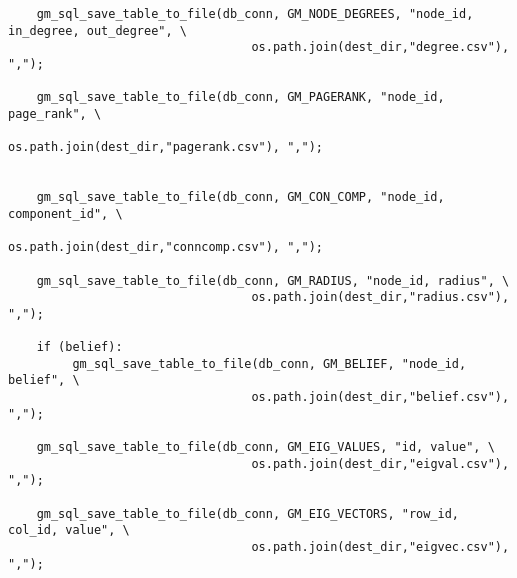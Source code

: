\begin{lstlisting}
    gm_sql_save_table_to_file(db_conn, GM_NODE_DEGREES, "node_id, in_degree, out_degree", \
                                  os.path.join(dest_dir,"degree.csv"), ",");

    gm_sql_save_table_to_file(db_conn, GM_PAGERANK, "node_id, page_rank", \
                                  os.path.join(dest_dir,"pagerank.csv"), ",");


    gm_sql_save_table_to_file(db_conn, GM_CON_COMP, "node_id, component_id", \
                                  os.path.join(dest_dir,"conncomp.csv"), ",");

    gm_sql_save_table_to_file(db_conn, GM_RADIUS, "node_id, radius", \
                                  os.path.join(dest_dir,"radius.csv"), ",");

    if (belief):
         gm_sql_save_table_to_file(db_conn, GM_BELIEF, "node_id, belief", \
                                  os.path.join(dest_dir,"belief.csv"), ",");

    gm_sql_save_table_to_file(db_conn, GM_EIG_VALUES, "id, value", \
                                  os.path.join(dest_dir,"eigval.csv"), ",");

    gm_sql_save_table_to_file(db_conn, GM_EIG_VECTORS, "row_id, col_id, value", \
                                  os.path.join(dest_dir,"eigvec.csv"), ",");



\end{lstlisting}
